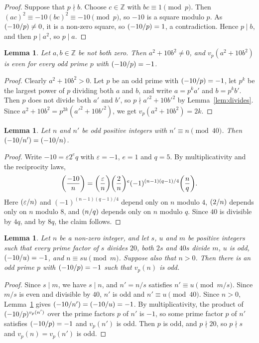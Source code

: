 \documentclass[11pt]{article}
\newtheorem{lemma}[theorem]{Lemma}
\newcommand{\Z}{\mathbb{Z}}
\newcommand{\leg}[2]{\mathchoice{\biggl(\dfrac{#1}{#2}\biggr)}{(#1/#2)}{(#1/#2)}{(#1/#2)}}
\begin{document}
\begin{proof}
Suppose that $p\nmid b$. Choose $c\in\Z$ with $bc\equiv1\pmod p$. Then $(ac)^2\equiv-10(bc)^2\equiv-10\pmod p$, so $-10$ is a square modulo $p$. As $\leg{-10}{p}\neq0$, it is a non-zero square, so $\leg{-10}{p}=1$, a contradiction. Hence $p\mid b$, and then $p\mid a^2$, so $p\mid a$.
\end{proof}

\begin{lemma}\label{lem:even}
Let $a,b\in\Z$ be not both zero. Then $a^2+10b^2\neq0$, and $v_p(a^2+10b^2)$ is even for every odd prime $p$ with $\leg{-10}{p}=-1$.
\end{lemma}

\begin{proof}
Clearly $a^2+10b^2>0$. Let $p$ be an odd prime with $\leg{-10}{p}=-1$, let $p^k$ be the largest power of $p$ dividing both $a$ and $b$, and write $a=p^ka'$ and $b=p^kb'$. Then $p$ does not divide both $a'$ and $b'$, so $p\nmid a'^2+10b'^2$ by Lemma~\ref{lem:divides}. Since $a^2+10b^2=p^{2k}(a'^2+10b'^2)$, we get $v_p(a^2+10b^2)=2k$.
\end{proof}

\begin{lemma}\label{lem:period}
Let $n$ and $n'$ be odd positive integers with $n'\equiv n\pmod{40}$. Then $\leg{-10}{n'}=\leg{-10}{n}$.
\end{lemma}

\begin{proof}
Write $-10=\varepsilon2^eq$ with $\varepsilon=-1$, $e=1$ and $q=5$. By multiplicativity and the reciprocity laws,
\[
\leg{-10}{n}=\leg{\varepsilon}{n}\leg{2}{n}^e(-1)^{(n-1)(q-1)/4}\leg{n}{q}.
\]
Here $\leg{\varepsilon}{n}$ and $(-1)^{(n-1)(q-1)/4}$ depend only on $n$ modulo $4$, $\leg{2}{n}$ depends only on $n$ modulo $8$, and $\leg{n}{q}$ depends only on $n$ modulo $q$. Since $40$ is divisible by $4q$, and by $8q$, the claim follows.
\end{proof}

\begin{lemma}\label{lem:odd}
Let $n$ be a non-zero integer, and let $s$, $u$ and $m$ be positive integers such that every prime factor of $s$ divides $20$, both $2s$ and $40s$ divide $m$, $u$ is odd, $\leg{-10}{u}=-1$, and $n\equiv su\pmod m$. Suppose also that $n>0$. Then there is an odd prime $p$ with $\leg{-10}{p}=-1$ such that $v_p(n)$ is odd.
\end{lemma}

\begin{proof}
Since $s\mid m$, we have $s\mid n$, and $n'=n/s$ satisfies $n'\equiv u\pmod{m/s}$. Since $m/s$ is even and divisible by $40$, $n'$ is odd and $n'\equiv u\pmod{40}$. Since $n>0$, Lemma~\ref{lem:period} gives $\leg{-10}{n'}=\leg{-10}{u}=-1$. By multiplicativity, the product of $\leg{-10}{p}^{v_p(n')}$ over the prime factors $p$ of $n'$ is $-1$, so some prime factor $p$ of $n'$ satisfies $\leg{-10}{p}=-1$ and $v_p(n')$ is odd. Then $p$ is odd, and $p\nmid20$, so $p\nmid s$ and $v_p(n)=v_p(n')$ is odd.
\end{proof}
\end{document}
